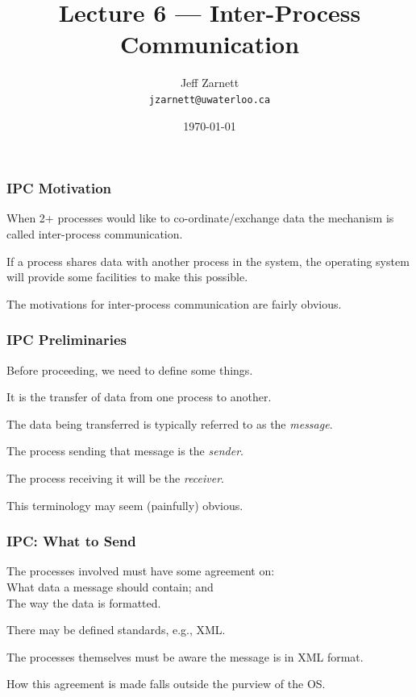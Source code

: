 

\title{Lecture 6 --- Inter-Process Communication}

\author{Jeff Zarnett \\ \small \texttt{jzarnett@uwaterloo.ca}}
\date{\today}




\begin{frame}
  \titlepage

 \end{frame}

\begin{frame}
\frametitle{IPC Motivation}

When 2+ processes would like to co-ordinate/exchange data the mechanism is called \alert{inter-process communication}.

If a process shares data with another process in the system, the operating system will provide some facilities to make this possible. 

The motivations for inter-process communication are fairly obvious.

\end{frame}


\begin{frame}
\frametitle{IPC Preliminaries}

Before proceeding, we need to define some things. 

It is the transfer of data from one process to another. 

The data being transferred is typically referred to as the \textit{message}. 

The process sending that message is the \textit{sender}.

The process receiving it will be the \textit{receiver}.

 This terminology may seem (painfully) obvious. 

\end{frame}


\begin{frame}
\frametitle{IPC: What to Send}

The processes involved must have some agreement on:\\
\quad What data a message should contain; and\\
\quad The way the data is formatted. 

There may be defined standards, e.g., XML.

The processes themselves must be aware the message is in XML format. 

How this agreement is made falls outside the purview of the OS.

\end{frame}

